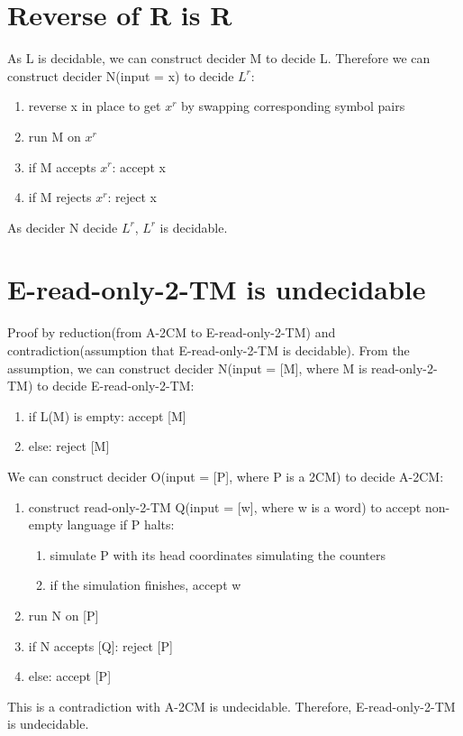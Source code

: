 \documentclass{article}
\begin{document}
\section{Reverse of R is R}
As L is decidable, we can construct decider M to decide L. Therefore we can construct decider N(input = x) to decide $ L^r $:
\begin{enumerate}
	\item reverse x in place to get $ x^r $ by swapping corresponding symbol pairs
	\item run M on $ x^r $
	\item if M accepts $ x^r $: accept x
	\item if M rejects $ x^r $: reject x
\end{enumerate}
As decider N decide $ L^r $, $ L^r $ is decidable.

\section{E-read-only-2-TM is undecidable}
Proof by reduction(from A-2CM to E-read-only-2-TM) and contradiction(assumption that E-read-only-2-TM is decidable). From the assumption, we can construct decider N(input = [M], where M is read-only-2-TM) to decide E-read-only-2-TM:
\begin{enumerate}
	\item if L(M) is empty: accept [M]
	\item else: reject [M]
\end{enumerate}
We can construct decider O(input = [P], where P is a 2CM) to decide A-2CM:
\begin{enumerate}
	\item construct read-only-2-TM Q(input = [w], where w is a word) to accept 
	non-empty language if P halts:
	\begin{enumerate}
		\item simulate P with its head coordinates simulating the counters
		\item if the simulation finishes, accept w
	\end{enumerate}
	\item run N on [P]
	\item if N accepts [Q]: reject [P]
	\item else: accept [P]
\end{enumerate}
This is a contradiction with A-2CM is undecidable. Therefore, E-read-only-2-TM is undecidable.
\end{document}
